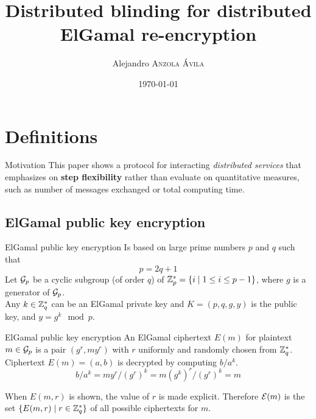\documentclass[10pt]{beamer}
\title{Distributed blinding for distributed ElGamal re-encryption}
\date{\today}
\institute{Boise State University}
\begin{document}
\author{Alejandro \textsc{Anzola \'Avila}}


\maketitle




\section{Definitions}
\begin{frame}{Motivation}
  This paper shows a protocol for interacting \emph{distributed services} that emphasizes on \textbf{step flexibility} rather than evaluate on quantitative measures, such as number of messages exchanged or total computing time.
\end{frame}

\subsection{ElGamal public key encryption}
\begin{frame}{ElGamal public key encryption}
  Is based on large prime numbers $p$ and $q$ such that
  \begin{equation*}
    p = 2q +1
  \end{equation*}
  Let ${\mathcal{G}}_p$ be a cyclic subgroup (of order $q$) of $\mathbb{Z}_p^{\ast} = \{i \mid 1 \le i \le p-1\}$, where $g$ is a generator of ${\mathcal{G}}_p$. \\
  Any $k\in\mathbb{Z}_q^{\ast}$ can be an ElGamal private key and $K = (p, q, g, y)$ is the public key, and $y = g^{k} \mod p$.
\end{frame}

\begin{frame}{ElGamal public key encryption}
  An ElGamal ciphertext $E(m)$ for plaintext $m\in{\mathcal{G}}_p$ is a pair $(g^r, my^{r})$ with $r$ uniformly and randomly chosen from $\mathbb{Z}_q^{\ast}$. \\
  Ciphertext $E(m) = (a, b)$ is decrypted by computing $b / a^k$.
  \begin{equation*}
    b/a^k = my^{r} / {(g^{r})}^{k} = m {(g^k)}^r / {(g^r)}^k = m
  \end{equation*}

  When $E(m, r)$ is shown, the value of $r$ is made explicit. Therefore ${\mathcal{E}}(m)$ is the set $\{ E(m, r) \mid r \in \mathbb{Z}_q^{\ast} \}$ of all possible ciphertexts for $m$.
\end{frame}
\end{document}
